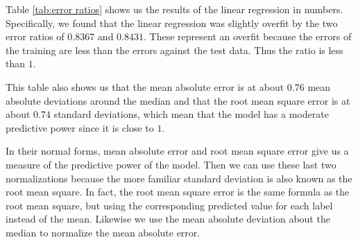 \documentclass[11pt]{report}
\begin{document}
Table \ref{tab:error ratios} shows us the results of the linear regression in numbers.
Specifically,
we found that the linear regression was slightly overfit by the two error ratios of \(\num{0.8367}\) and \(\num{0.8431}\).
These represent an overfit because the errors of the training are less than the errors against the test data.
Thus the ratio is less than \(1\).

This table also shows us that the mean absolute error is at about \(0.76\) mean absolute deviations around the median
and that the root mean square error is at about \(0.74\) standard deviations,
which mean that the model has a moderate predictive power since it is close to \(1\).

In their normal forms, mean absolute error and root mean square error give us a measure of the predictive power of the model\cite{rms2016}.
Then
we can use these last two normalizations because the more familiar standard deviation is also known as the root mean square.
In fact, the root mean square error is the same formula as the root mean square,
but using the corresponding predicted value for each label instead of the mean.
Likewise we use the mean absolute deviation about the median to normalize the mean absolute error.
\end{document}
